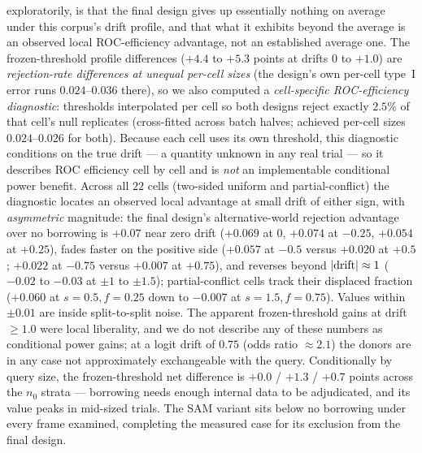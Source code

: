 \documentclass[11pt]{article}
\begin{document}
exploratorily, is that the final design gives up essentially nothing on
average under this corpus's drift profile, and that what it exhibits
beyond the average is an observed local ROC-efficiency advantage, not an
established average one. The frozen-threshold profile differences
($+4.4$ to $+5.3$ points at drifts $0$ to $+1.0$) are \emph{rejection-rate
differences at unequal per-cell sizes} (the design's own per-cell type~I
error runs $0.024$--$0.036$ there), so we also computed a
\emph{cell-specific ROC-efficiency diagnostic}: thresholds interpolated
per cell so both designs reject exactly
$2.5\%$ of that cell's null replicates (cross-fitted across batch halves;
achieved per-cell sizes $0.024$--$0.026$ for both). Because each cell
uses its own threshold, this diagnostic conditions on the true drift ---
a quantity unknown in any real trial --- so it describes ROC efficiency
cell by cell and is \emph{not} an implementable conditional power
benefit. Across all $22$ cells (two-sided uniform and partial-conflict)
the diagnostic locates an observed local advantage at small drift of
either sign, with \emph{asymmetric} magnitude: the final design's
alternative-world rejection advantage over no borrowing is $+0.07$ near
zero drift ($+0.069$ at $0$, $+0.074$ at $-0.25$, $+0.054$ at $+0.25$),
fades faster on the positive side ($+0.057$ at $-0.5$ versus $+0.020$ at
$+0.5$; $+0.022$ at $-0.75$ versus $+0.007$ at $+0.75$), and reverses
beyond $|{\rm drift}|
\approx 1$ ($-0.02$ to $-0.03$ at $\pm 1$ to $\pm 1.5$); partial-conflict
cells track their displaced fraction ($+0.060$ at $s{=}0.5, f{=}0.25$
down to $-0.007$ at $s{=}1.5, f{=}0.75$). Values within $\pm 0.01$ are
inside split-to-split noise. The apparent frozen-threshold gains at
drift $\ge 1.0$ were local liberality, and we do not describe any of
these numbers as conditional power gains; at a logit drift of $0.75$
(odds ratio $\approx 2.1$) the donors are in any case not approximately
exchangeable with the query.
Conditionally by query size, the frozen-threshold net difference
is $+0.0$ / $+1.3$ / $+0.7$ points across the $n_0$ strata --- borrowing
needs enough internal data to be adjudicated, and its value peaks in
mid-sized trials. The SAM variant sits below no borrowing under every
frame examined, completing the measured case for its exclusion from the
final design.
\end{document}
